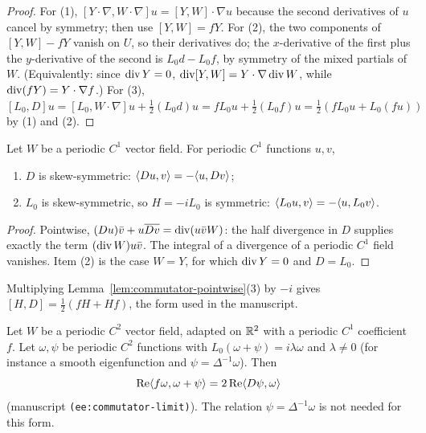\begin{proof}
\leanok
For (1), $[Y\cdot\nabla,W\cdot\nabla]u=[Y,W]\cdot\nabla u$ because the second
derivatives of $u$ cancel by symmetry; then use $[Y,W]=fY$. For (2), the two
components of $[Y,W]-fY$ vanish on $U$, so their derivatives do; the
$x$-derivative of the first plus the $y$-derivative of the second is
$L_0d-L_0f$, by symmetry of the mixed partials of $W$. (Equivalently: since
$\operatorname{div} Y=0$, $\operatorname{div}[Y,W]=Y\cdot\nabla\operatorname{div} W$, while $\operatorname{div}(fY)=Y\cdot\nabla f$.)
For (3), $[L_0,D]u=[L_0,W\cdot\nabla]u+\tfrac12(L_0d)u=fL_0u+\tfrac12(L_0f)u
=\tfrac12(fL_0u+L_0(fu))$ by (1) and (2).
\end{proof}

\begin{lemma}
\label{lem:commutator-algebra}
\leanok
Let $W$ be a periodic $C^1$ vector field. For periodic $C^1$ functions $u,v$,
\begin{enumerate}
  \item $D$ is skew-symmetric: $\langle Du,v\rangle=-\langle u,Dv\rangle$;
  \item $L_0$ is skew-symmetric, so $H=-iL_0$ is symmetric:
        $\langle L_0u,v\rangle=-\langle u,L_0v\rangle$.
\end{enumerate}
\end{lemma}

\begin{proof}
\leanok
Pointwise, $(Du)\bar v+u\overline{Dv}=\operatorname{div}(u\bar vW)$: the half divergence in
$D$ supplies exactly the term $(\operatorname{div} W)u\bar v$. The integral of a divergence
of a periodic $C^1$ field vanishes. Item (2) is the case $W=Y$, for which
$\operatorname{div} Y=0$ and $D=L_0$.
\end{proof}

\begin{remark}
Multiplying Lemma~\ref{lem:commutator-pointwise}(3) by $-i$ gives
$[H,D]=\tfrac12(fH+Hf)$, the form used in the manuscript.
\end{remark}

\begin{lemma}
\label{lem:virial-smooth}
\leanok
Let $W$ be a periodic $C^2$ vector field, adapted on $\mathbb{R}^2$ with a periodic $C^1$
coefficient $f$. Let $\omega,\psi$ be periodic $C^2$ functions with
$L_0(\omega+\psi)=i\lambda\omega$ and $\lambda\ne0$ (for instance a smooth
eigenfunction and $\psi=\Delta^{-1}\omega$). Then
\begin{equation*}
  \operatorname{Re}\langle f\omega,\omega+\psi\rangle=2\operatorname{Re}\langle D\psi,\omega\rangle
\end{equation*}
(manuscript \texttt{(ee:commutator-limit)}). The relation $\psi=\Delta^{-1}\omega$
is not needed for this form.
\end{lemma}

